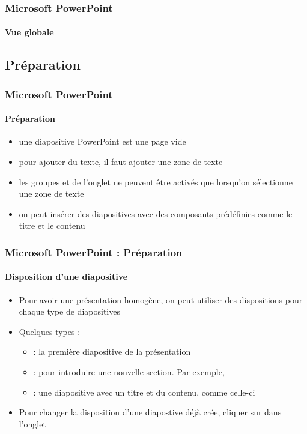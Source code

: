 \documentclass[xcolor=table, usenames,dvipsnames]{beamer}
\begin{document}
\begin{frame}
\frametitle{Microsoft PowerPoint}
\framesubtitle{Vue globale}

\begin{center}
\end{center}

\end{frame}

\subsection{Préparation}

\begin{frame}
\frametitle{Microsoft PowerPoint}
\framesubtitle{Préparation}

\begin{itemize}
	\item une diapositive PowerPoint est une page vide 
	\item pour ajouter du texte, il faut ajouter une zone de texte
	\item les groupes  et  de l'onglet  ne peuvent être activés que lorsqu'on sélectionne une zone de texte 
	\item on peut insérer des diapositives avec des composants prédéfinies comme le titre et le contenu
\end{itemize}

\end{frame}

\begin{frame}
\frametitle{Microsoft PowerPoint : Préparation}
\framesubtitle{Disposition d'une diapositive}

\begin{minipage}{0.60\textwidth}
	\begin{itemize}
		\item Pour avoir une présentation homogène, on peut utiliser des dispositions pour chaque type de diapositives
		\item Quelques types : 
		\begin{itemize}
			\item {} : la première diapositive de la présentation
			\item {} : pour introduire une nouvelle section. Par exemple, 
			\item {} : une diapositive avec un titre et du contenu, comme celle-ci
		\end{itemize}
		\item Pour changer la disposition d'une diapostive déjà crée, cliquer sur  dans l'onglet 
	\end{itemize}
\end{minipage}
%
\begin{minipage}{0.39\textwidth}
\end{minipage}

\end{frame}
\end{document}
